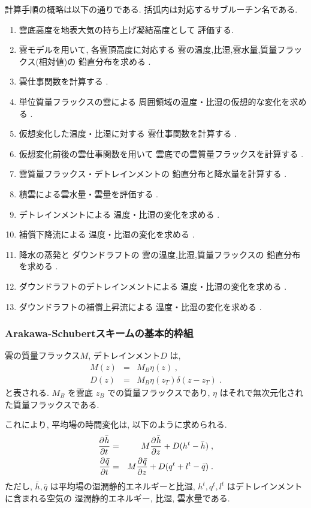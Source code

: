計算手順の概略は以下の通りである.
括弧内は対応するサブルーチン名である.
%
\begin{enumerate}
\item 雲底高度を地表大気の持ち上げ凝結高度として
      評価する.
\item 雲モデルを用いて, 
      各雲頂高度に対応する
      雲の温度,比湿,雲水量,質量フラックス(相対値)の
      鉛直分布を求める .
\item 雲仕事関数を計算する .
\item 単位質量フラックスの雲による
      周囲領域の温度・比湿の仮想的な変化を求める .
\item 仮想変化した温度・比湿に対する
      雲仕事関数を計算する .
\item 仮想変化前後の雲仕事関数を用いて
      雲底での雲質量フラックスを計算する .
\item 雲質量フラックス・デトレインメントの
      鉛直分布と降水量を計算する .
\item 積雲による雲水量・雲量を評価する .
\item デトレインメントによる
      温度・比湿の変化を求める .
\item 補償下降流による
      温度・比湿の変化を求める .
\item 降水の蒸発と
      ダウンドラフトの
      雲の温度,比湿,質量フラックスの
      鉛直分布を求める .
\item ダウンドラフトのデトレインメントによる
      温度・比湿の変化を求める .      
\item ダウンドラフトの補償上昇流による
      温度・比湿の変化を求める .
\end{enumerate}

\subsubsection{Arakawa-Schubertスキームの基本的枠組}

雲の質量フラックス$M$, デトレインメント$D$ は, 
\begin{eqnarray}
  M(z)    & = & M_B \eta(z) \; , \\
  D(z)    & = & M_B \eta(z_T) \delta (z-z_T) \; .
\end{eqnarray}
と表される. 
$M_B$ を雲底 $z_B$ での質量フラックスであり,
$\eta$ はそれで無次元化された質量フラックスである.

これにより, 平均場の時間変化は, 以下のように求められる.
\begin{eqnarray}
  \DP{\bar{h}}{t} & = & M \DP{\bar{h}}{z} 
                       + D( h^t - \bar{h} ) \; , \\
  \DP{\bar{q}}{t} & = & M\DP{\bar{q}}{z} 
                       + D( q^t + l^t - \bar{q} ) \; .
\end{eqnarray}
ただし, $\bar{h}, \bar{q}$ は平均場の湿潤静的エネルギーと比湿,
$h^t, q^t, l^t$ はデトレインメントに含まれる空気の
湿潤静的エネルギー, 比湿, 雲水量である.

